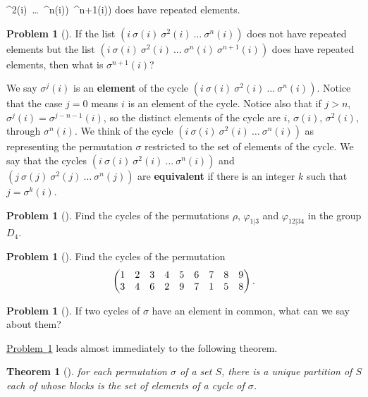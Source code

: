 \documentclass[10pt,]{book}
\newcommand{\terminology}[1]{\textbf{#1}}
\theoremstyle{plain}
\newtheorem{theorem}{Theorem}[section]
\theoremstyle{definition}
\newtheorem{activity}[project]{Problem}
\theoremstyle{definition}
\numberwithin{equation}{chapter}
\newcommand{\gt}{>}
\newcommand{\amp}{&}
\begin{document}
\sigma^2(i)\ \ldots\ \sigma^n(i))\ \sigma^{n+1}(i))\) does have repeated elements.%
\begin{activity}[]\marginsymbol[-1em]{} \label{activity-272}
If the list \((i\ \sigma(i)\ \sigma^2(i)\ \ldots\ \sigma^n(i))\) does not have repeated elements but the list \((i\ \sigma(i)\ \sigma^2(i)\ \ldots\ \sigma^n(i)\ \sigma^{n+1}(i))\) does have repeated elements, then what is \(\sigma^{n+1}(i)\)?%
\end{activity}
We say \(\sigma^j(i)\) is an \terminology{element} of the cycle \((i\ \sigma(i)\ \sigma^2(i)\ \ldots\ \sigma^n(i))\).  Notice that the case \(j=0\) means \(i\) is an element of the cycle.  Notice also that if \(j\gt n\), \(\sigma^j(i) = \sigma^{j-n-1}(i)\), so the distinct elements of the cycle are \(i\), \(\sigma(i)\), \(\sigma^2(i)\), through \(\sigma^n(i)\). We think of the cycle \((i\ \sigma(i)\ \sigma^2(i)\ \ldots\ \sigma^n(i))\) as representing the permutation \(\sigma\) restricted to the set of elements of the cycle. We say that the cycles \((i\
\sigma(i)\
\sigma^2(i)\ \ldots\ \sigma^n(i))\) and \((j\
\sigma(j)\
\sigma^2(j)\ \ldots\ \sigma^n(j))\) are \terminology{equivalent} if there is an integer \(k\) such that \(j=
\sigma^k(i)\).%
\begin{activity}[] \label{d4-cycles}
Find the cycles of the permutations \(\rho\), \(\varphi_{1|3}\) and \(\varphi_{12|34}\) in the group \(D_4\).%
\end{activity}
\begin{activity}[]\marginsymbol[-1em]{} \label{permutation-cycles}
Find the cycles of the permutation%
\begin{equation*}
\begin{pmatrix}1\amp 2\amp 3\amp 4\amp 5\amp 6\amp 7\amp 8\amp 9\cr
3\amp 4\amp 6\amp 2\amp 9\amp 7\amp 1\amp 5\amp 8
\end{pmatrix}\text{.}
\end{equation*}
%
\end{activity}
\begin{activity}[]\marginsymbol[-1em]{} \label{common-elements}
If two cycles of \(\sigma\) have an element in common, what can we say about them?%
\end{activity}
\hyperref[common-elements]{Problem~\ref{common-elements}} leads almost immediately to the following theorem.%
\begin{theorem}[{}]\label{unique-partition}
for each permutation \(\sigma\) of a set \(S\), there is a unique partition of \(S\) each of whose blocks is the set of elements of a cycle of \(\sigma\).%
\end{theorem}
\end{document}
